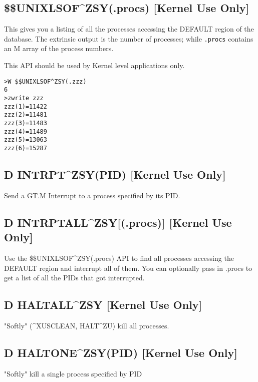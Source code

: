 \documentclass[]{article}
\begin{document}
\subsection{\$\$UNIXLSOF\^{}ZSY(.procs) [Kernel Use Only]}
This gives you a listing of all the processes accessing the DEFAULT region of the database. The extrinsic output is the number of processes; while \texttt{.procs} contains an M array of the process numbers.

This API should be used by Kernel level applications only.
\lstset{
	caption=UNIXLSOF Entry Point
}
\begin{lstlisting}
>W $$UNIXLSOF^ZSY(.zzz)
6
>zwrite zzz
zzz(1)=11422
zzz(2)=11481
zzz(3)=11483
zzz(4)=11489
zzz(5)=13063
zzz(6)=15287
\end{lstlisting}

\subsection{D INTRPT\^{}ZSY(PID) [Kernel Use Only]}
Send a GT.M Interrupt to a process specified by its PID.

\subsection{D INTRPTALL\^{}ZSY[(.procs)] [Kernel Use Only]}
Use the \$\$UNIXLSOF\^{}ZSY(.procs) API to find all processes accessing the DEFAULT region and interrupt all of them. You can optionally pass in .procs to get a list of all the PIDs that got interrupted.

\subsection{D HALTALL\^{}ZSY [Kernel Use Only]}
"Softly" (\^{}XUSCLEAN, HALT\^{}ZU) kill all processes.

\subsection{D HALTONE\^{}ZSY(PID) [Kernel Use Only]}
"Softly" kill a single process specified by PID
\end{document}
